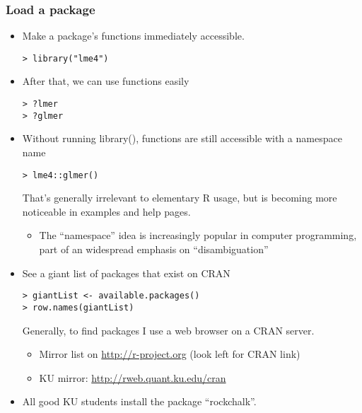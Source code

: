 \documentclass[11pt,canadian,english]{beamer}
\def\lyxframeend{} %
\begin{document}
\begin{frame}[containsverbatim]
\frametitle{Load a package}
\begin{itemize}
\item Make a package's functions immediately accessible. 


\begin{lstlisting}
> library("lme4")
\end{lstlisting}


\item After that, we can use functions easily


\begin{lstlisting}
> ?lmer
> ?glmer
\end{lstlisting}


\item Without running library(), functions are still accessible with a \alert{namespace}
name


\begin{lstlisting}
> lme4::glmer()
\end{lstlisting}



That's generally irrelevant to elementary R usage, but is becoming
more noticeable in examples and help pages.
\begin{itemize}
\item The ``namespace'' idea is increasingly popular in computer programming,
part of an widespread emphasis on ``disambiguation''
\end{itemize}
\end{itemize}
\end{frame}


\lyxframeend{}
\begin{itemize}
\item See a giant list of packages that exist on CRAN


\begin{lstlisting}
> giantList <- available.packages()
> row.names(giantList)
\end{lstlisting}



Generally, to find packages I use a web browser on a CRAN server. 
\begin{itemize}
\item Mirror list on \url{http://r-project.org} (look left for CRAN link)
\item KU mirror: \url{http://rweb.quant.ku.edu/cran}
\end{itemize}
\item All good KU students install the package ``rockchalk''.
\end{itemize}
\end{document}
